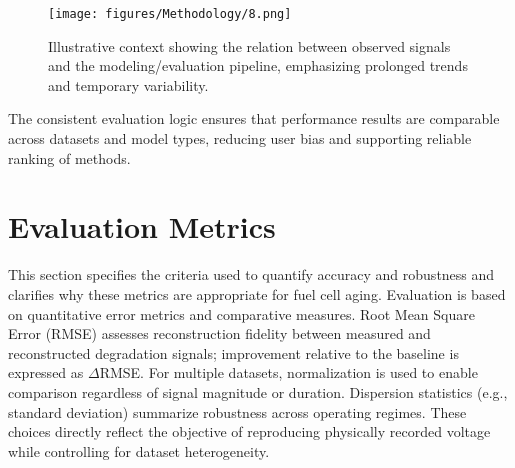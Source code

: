\begin{figure}[H]
\centering
 \texttt{[image: figures/Methodology/8.png]}
 \caption[Illustrative modeling/evaluation context]{Illustrative context showing the relation between observed signals and the modeling/evaluation pipeline, emphasizing prolonged trends and temporary variability.}
 \label{fig:train_val_example}
\end{figure}

The consistent evaluation logic ensures that performance results are comparable across datasets and model types, reducing user bias and supporting reliable ranking of methods.

\section{Evaluation Metrics}
\label{sec:evaluation_metrics}
This section specifies the criteria used to quantify accuracy and robustness and clarifies why these metrics are appropriate for fuel cell aging.
Evaluation is based on quantitative error metrics and comparative measures. Root Mean Square Error (RMSE) assesses reconstruction fidelity between measured and reconstructed degradation signals; improvement relative to the baseline is expressed as \(\Delta\)RMSE. For multiple datasets, normalization is used to enable comparison regardless of signal magnitude or duration. Dispersion statistics (e.g., standard deviation) summarize robustness across operating regimes. These choices directly reflect the objective of reproducing physically recorded voltage while controlling for dataset heterogeneity.




